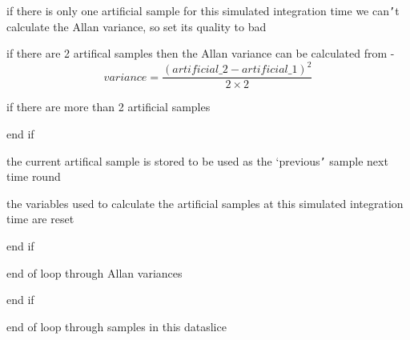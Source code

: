 {{                  if there is only one artificial sample for this simulated
                  integration time we can{\tt '}t calculate the Allan variance, so
                  set its quality to bad

                  if there are 2 artifical samples then the Allan variance
                  can be calculated from -
\begin{equation}
variance = \frac{(artificial\_2 - artificial\_1)^2}{2 \times 2}
\end{equation}

                  if there are more than 2 artificial samples

                  end if

                  the current artifical sample is stored to be used as the
                  `previous{\tt '} sample next time round

                  the variables used to calculate the artificial samples at
                  this simulated integration time are reset

               end if

            end of loop through Allan variances

         end if

      end of loop through samples in this dataslice
   }
}
